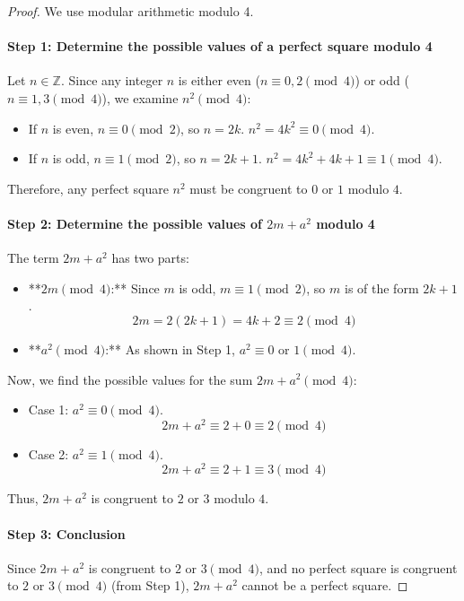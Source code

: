 \begin{proof}
We use modular arithmetic modulo 4.

\paragraph{Step 1: Determine the possible values of a perfect square modulo 4}
Let $n \in \mathbb{Z}$. Since any integer $n$ is either even ($n \equiv 0, 2 \pmod{4}$) or odd ($n \equiv 1, 3 \pmod{4}$), we examine $n^2 \pmod{4}$:
\begin{itemize}
    \item If $n$ is even, $n \equiv 0 \pmod{2}$, so $n=2k$. $n^2 = 4k^2 \equiv 0 \pmod{4}$.
    \item If $n$ is odd, $n \equiv 1 \pmod{2}$, so $n=2k+1$. $n^2 = 4k^2 + 4k + 1 \equiv 1 \pmod{4}$.
\end{itemize}
Therefore, any perfect square $n^2$ must be congruent to $0$ or $1$ modulo $4$.

\paragraph{Step 2: Determine the possible values of $2m+a^2$ modulo 4}
The term $2m+a^2$ has two parts:
\begin{itemize}
    \item **$2m \pmod{4}$:** Since $m$ is odd, $m \equiv 1 \pmod{2}$, so $m$ is of the form $2k+1$.
    $$ 2m = 2(2k+1) = 4k + 2 \equiv 2 \pmod{4} $$
    \item **$a^2 \pmod{4}$:** As shown in Step 1, $a^2 \equiv 0$ or $1 \pmod{4}$.
\end{itemize}
Now, we find the possible values for the sum $2m+a^2 \pmod{4}$:
\begin{itemize}
    \item Case 1: $a^2 \equiv 0 \pmod{4}$.
    $$ 2m+a^2 \equiv 2 + 0 \equiv 2 \pmod{4} $$
    \item Case 2: $a^2 \equiv 1 \pmod{4}$.
    $$ 2m+a^2 \equiv 2 + 1 \equiv 3 \pmod{4} $$
\end{itemize}
Thus, $2m+a^2$ is congruent to $2$ or $3$ modulo $4$.

\paragraph{Step 3: Conclusion}
Since $2m+a^2$ is congruent to $2$ or $3 \pmod{4}$, and no perfect square is congruent to $2$ or $3 \pmod{4}$ (from Step 1), $2m+a^2$ cannot be a perfect square.
\end{proof}
\newpage
